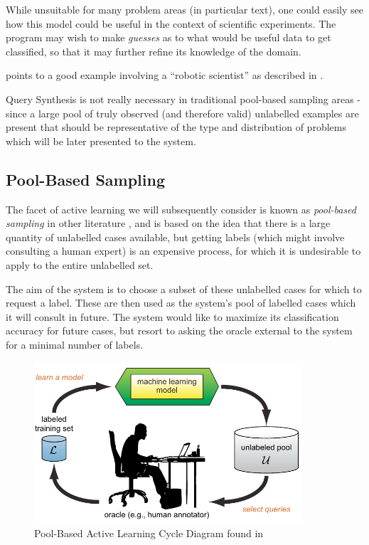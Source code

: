 \documentclass[a4paper,11pt]{report}
\begin{document}
While unsuitable for many problem areas (in particular text), one could easily see how this model could be useful in the context of scientific experiments. The program may wish to make \emph{guesses} as to what would be useful data to get classified, so that it may further refine its knowledge of the domain.

\citet{Settles2010} points to a good example involving a ``robotic scientist'' as described in \citet{King2009}.

Query Synthesis is not really necessary in traditional pool-based sampling areas - since a large pool of truly observed (and therefore valid) unlabelled examples are present that should be representative of the type and distribution of problems which will be later presented to the system.

\subsection{Pool-Based Sampling}

The facet of active learning we will subsequently consider is known as \emph{pool-based sampling} in other literature \citep{Settles2010}, and is based on the idea that there is a large quantity of unlabelled cases available, but getting labels (which might involve consulting a human expert) is an expensive process, for which it is undesirable to apply to the entire unlabelled set. 

The aim of the system is to choose a subset of these unlabelled cases for which to request a label. These are then used as the system's pool of labelled cases which it will consult in future. The system would like to maximize its classification accuracy for future cases, but resort to asking the oracle external to the system for a minimal number of labels.

\begin{figure}[h!] \centering
\includegraphics[width=10cm]{./Others/Settles2010PoolBasedImage}
\caption*{Pool-Based Active Learning Cycle Diagram found in \citet{Settles2010}}
\end{figure}
\end{document}
